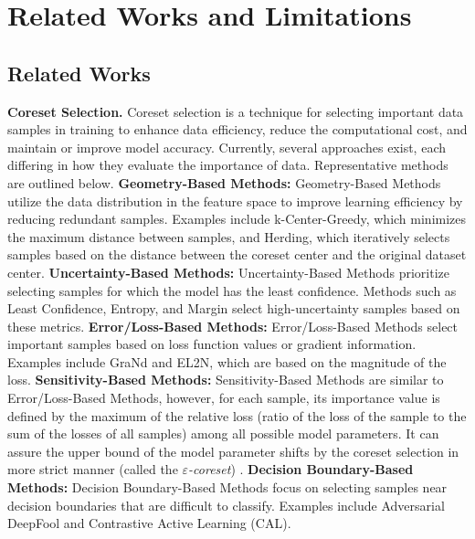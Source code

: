 
\section{Related Works and Limitations}
\label{sec:related-limits}

\subsection{Related Works}
\label{subsec:related}

\textbf{Coreset Selection.}
Coreset selection is a technique for selecting important data samples in training to enhance data efficiency, reduce the computational cost, and maintain or improve model accuracy.
%
Currently, several approaches exist, each differing in how they evaluate the importance of data.
%
Representative methods are outlined below.
%
\textbf{Geometry-Based Methods:}
%
Geometry-Based Methods utilize the data distribution in the feature space to improve learning efficiency by reducing redundant samples.
%
Examples include k-Center-Greedy\citep{sener2017active}, which minimizes the maximum distance between samples, and Herding\citep{welling2009herding}, which iteratively selects samples based on the distance between the coreset center and the original dataset center.
%
\textbf{Uncertainty-Based Methods:}
%
Uncertainty-Based Methods prioritize selecting samples for which the model has the least confidence.
%
Methods such as Least Confidence, Entropy, and Margin select high-uncertainty samples based on these metrics\citep{coleman2019selection}.
%
\textbf{Error/Loss-Based Methods:}
%
Error/Loss-Based Methods select important samples based on loss function values or gradient information.
%
Examples include GraNd\citep{paul2021deep} and EL2N\citep{paul2021deep}, which are based on the magnitude of the loss.
%
\textbf{Sensitivity-Based Methods:}
%
Sensitivity-Based Methods are similar to Error/Loss-Based Methods, however, for each sample, its importance value is defined by the maximum of the relative loss (ratio of the loss of the sample to the sum of the losses of all samples) among all possible model parameters. It can assure the upper bound of the model parameter shifts by the coreset selection in more strict manner (called the \emph{$\varepsilon$-coreset}) \citep{munteanu2018coresets,tukan2020coresets,tuka2021coresets,tolochinksy2022generic,alishahi2024dimensional}.
%
\textbf{Decision Boundary-Based Methods:}
%
Decision Boundary-Based Methods focus on selecting samples near decision boundaries that are difficult to classify.
%
Examples include Adversarial DeepFool\citep{ducoffe2018adversarial} and Contrastive Active Learning (CAL)\citep{margatina2021active}.
